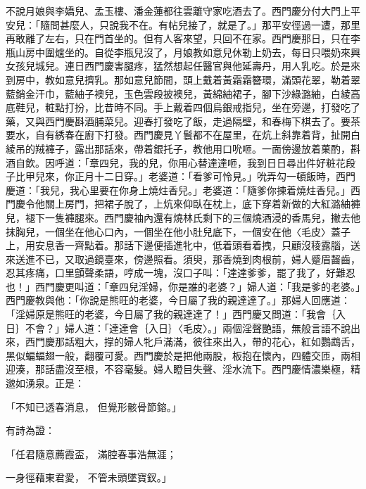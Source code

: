 不說月娘與李嬌兒、孟玉樓、潘金蓮都往雲離守家吃酒去了。西門慶分付大門上平安兒：「隨問甚麼人，只說我不在。有帖兒接了，就是了。」那平安徑過一遭，那里再敢離了左右，只在門首坐的。但有人客來望，只回不在家。西門慶那日，只在李瓶山房中圍爐坐的。自從李瓶兒沒了，月娘教如意兒休勒上奶去，每日只喂奶來興女孩兒城兒。連日西門慶害腿疼，猛然想起任醫官與他延壽丹，用人乳吃。於是來到房中，教如意兒擠乳。那如意兒節間，頭上戴着黃霜霜簪環，滿頭花翠，勒着翠藍銷金汗巾，藍紬子襖兒，玉色雲段披襖兒，黃綿紬裙子，腳下沙綠潞紬，白綾高底鞋兒，粧點打扮，比昔時不同。手上戴着四個烏銀戒指兒，坐在旁邊，打發吃了藥，又與西門慶斟酒脯菜兒。迎春打發吃了飯，走過隔壁，和春梅下棋去了。要茶要水，自有綉春在廚下打發。西門慶見丫鬟都不在屋里，在炕上斜靠着背，扯開白綾吊的羢褲子，露出那話來，帶着銀托子，教他用口吮咂。一面傍邊放着菓酌，斟酒自飲。因呼道：「章四兒，我的兒，你用心替達達咂，我到日日尋出件好粧花段子比甲兒來，你正月十二日穿。」老婆道：「看爹可怜見。」吮弄勾一頓飯時，西門慶道：「我兒，我心里要在你身上燒炷香兒。」老婆道：「隨爹你揀着燒炷香兒。」西門慶令他關上房門，把裙子脫了，上炕來仰臥在枕上，底下穿着新做的大紅潞紬褲兒，褪下一隻褲腿來。西門慶袖內還有燒林氏剩下的三個燒酒浸的香馬兒，撇去他抹胸兒，一個坐在他心口內，一個坐在他小肚兒底下，一個安在他〈毛皮〉蓋子上，用安息香一齊點着。那話下邊便插進牝中，低着頭看着拽，只顧沒稜露腦，送來送進不已，又取過鏡臺來，傍邊照看。須臾，那香燒到肉根前，婦人蹙眉齧齒，忍其疼痛，口里顫聲柔語，哼成一塊，沒口子叫：「達達爹爹，罷了我了，好難忍也！」西門慶更叫道：「章四兒淫婦，你是誰的老婆？」婦人道：「我是爹的老婆。」西門慶教與他：「你說是熊旺的老婆，今日屬了我的親達達了。」那婦人回應道：「淫婦原是熊旺的老婆，今日屬了我的親達達了！」西門慶又問道：「我會｛入日｝不會？」婦人道：「達達會｛入日｝〈毛皮〉。」兩個淫聲艷語，無般言語不說出來，西門慶那話粗大，撑的婦人牝戶滿滿，彼往來出入，帶的花心，紅如鸚鵡舌，黑似蝙蝠翅一般，翻覆可愛。西門慶於是把他兩股，板抱在懷內，四體交匝，兩相迎湊，那話盡沒至根，不容毫髮。婦人瞪目失聲、淫水流下。西門慶情濃樂極，精邈如湧泉。正是：

「不知已透春消息，  但覺形骸骨節鎔。」

有詩為證：

「任君隨意薦霞盃，  滿腔春事浩無涯；

一身徑藉東君愛，  不管未頭墜寶釵。」

